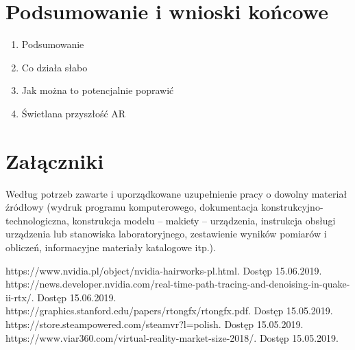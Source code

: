 \documentclass[12pt,twoside]{article}
\begin{document}
\clearpage

\section{Podsumowanie i wnioski końcowe}
\begin{enumerate}[label=\alph*), leftmargin=1.25cm]
\item Podsumowanie
\item Co działa słabo
\item Jak można to potencjalnie poprawić
\item Świetlana przyszłość AR
\end{enumerate}

\clearpage

\section*{Załączniki}

Według potrzeb zawarte i uporządkowane uzupełnienie pracy o dowolny materiał źródłowy (wydruk programu komputerowego, dokumentacja kons\-truk\-cyj\-no-\-tech\-no\-lo\-gicz\-na, konstrukcja modelu -- makiety -- urządzenia, instrukcja obsługi urządzenia lub stanowiska laboratoryjnego, zestawienie wyników pomiarów i obliczeń, informacyjne materiały katalogowe itp.).


\clearpage


\begin{thebibliography}{11}
 https://www.nvidia.pl/object/nvidia-hairworks-pl.html. Dostęp 15.06.2019.
 https://news.developer.nvidia.com/real-time-path-tracing-and-denoising-in-quake-ii-rtx/. Dostęp 15.06.2019.
 https://graphics.stanford.edu/papers/rtongfx/rtongfx.pdf. Dostęp 15.05.2019.
 https://store.steampowered.com/steamvr?l=polish. Dostęp 15.05.2019. 
 https://www.viar360.com/virtual-reality-market-size-2018/. Dostęp 15.05.2019. 

\end{thebibliography}

\clearpage

\makesummary
\end{document}
